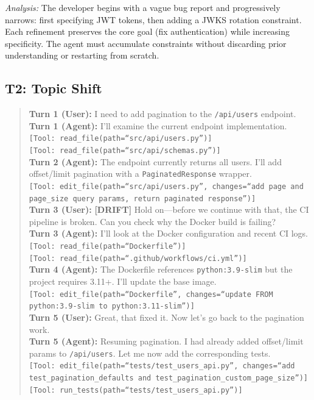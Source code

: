 \noindent\textit{Analysis:} The developer begins with a vague bug report and progressively narrows: first specifying JWT tokens, then adding a JWKS rotation constraint. Each refinement preserves the core goal (fix authentication) while increasing specificity. The agent must accumulate constraints without discarding prior understanding or restarting from scratch.

\subsection{T2: Topic Shift}

\begin{quote}
\small
\textbf{Turn 1 (User):} I need to add pagination to the \texttt{/api/users} endpoint.\\
\textbf{Turn 1 (Agent):} I'll examine the current endpoint implementation.\\
\texttt{[Tool: read\_file(path=``src/api/users.py'')]}\\
\texttt{[Tool: read\_file(path=``src/api/schemas.py'')]}\\[4pt]
\textbf{Turn 2 (Agent):} The endpoint currently returns all users. I'll add offset/limit pagination with a \texttt{PaginatedResponse} wrapper.\\
\texttt{[Tool: edit\_file(path=``src/api/users.py'', changes=``add page and page\_size query params, return paginated response'')]}\\[4pt]
\textbf{Turn 3 (User):} \textbf{[DRIFT]} Hold on---before we continue with that, the CI pipeline is broken. Can you check why the Docker build is failing?\\[4pt]
\textbf{Turn 3 (Agent):} I'll look at the Docker configuration and recent CI logs.\\
\texttt{[Tool: read\_file(path=``Dockerfile'')]}\\
\texttt{[Tool: read\_file(path=``.github/workflows/ci.yml'')]}\\[4pt]
\textbf{Turn 4 (Agent):} The Dockerfile references \texttt{python:3.9-slim} but the project requires 3.11+. I'll update the base image.\\
\texttt{[Tool: edit\_file(path=``Dockerfile'', changes=``update FROM python:3.9-slim to python:3.11-slim'')]}\\[4pt]
\textbf{Turn 5 (User):} Great, that fixed it. Now let's go back to the pagination work.\\
\textbf{Turn 5 (Agent):} Resuming pagination. I had already added offset/limit params to \texttt{/api/users}. Let me now add the corresponding tests.\\
\texttt{[Tool: edit\_file(path=``tests/test\_users\_api.py'', changes=``add test\_pagination\_defaults and test\_pagination\_custom\_page\_size'')]}\\
\texttt{[Tool: run\_tests(path=``tests/test\_users\_api.py'')]}
\end{quote}

